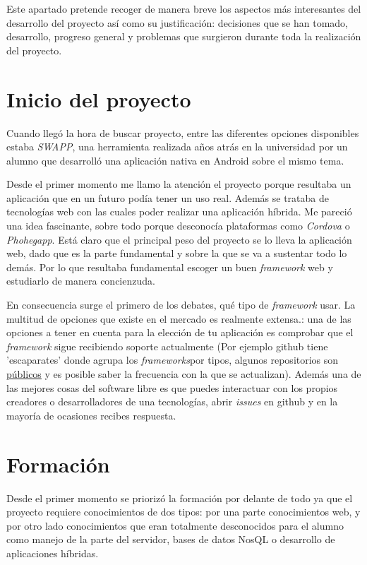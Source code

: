 
Este apartado pretende recoger de manera breve los aspectos más interesantes del desarrollo del proyecto así como su justificación: decisiones que se han tomado, desarrollo, progreso general y problemas que surgieron durante toda la realización del proyecto.


\section{Inicio del proyecto}\label{inicio-proyecto}
Cuando llegó la hora de buscar proyecto, entre las  diferentes opciones disponibles estaba \emph{SWAPP}, una herramienta realizada años atrás en la universidad por un alumno que desarrolló una aplicación nativa en Android sobre el mismo tema.

 Desde el primer momento me llamo la atención el proyecto porque resultaba un aplicación que en un futuro podía tener un uso real. Además se trataba de tecnologías web con las cuales poder realizar una aplicación híbrida. Me pareció una idea fascinante, sobre todo porque desconocía plataformas como \emph{Cordova} o \emph{Phohegapp}. Está claro que el principal peso del proyecto se lo lleva la aplicación web, dado que es la parte fundamental y sobre la que se va a sustentar todo lo demás. Por lo que resultaba fundamental escoger un buen \emph{framework} web y estudiarlo de manera concienzuda.
 
  En consecuencia surge el primero de los debates, qué tipo de \emph{framework} usar. La multitud de opciones que existe en el mercado es realmente extensa.: una de las opciones a tener en cuenta para la elección de tu aplicación es comprobar que el \emph{framework} sigue recibiendo soporte actualmente (Por ejemplo github tiene 'escaparates' donde agrupa los \emph{frameworks}por tipos, algunos repositorios son \href{ https://github.com/showcases/web-application-frameworks/}{públicos}  y es posible saber la frecuencia con la que se actualizan). Además una de las mejores cosas del software libre es que puedes interactuar con los propios creadores  o desarrolladores de una tecnologías, abrir \emph{issues} en github y en la mayoría de  ocasiones recibes respuesta. 
  

  \section{Formación}\label{formacion}
Desde el primer momento se priorizó la formación por delante de todo ya que el proyecto requiere conocimientos de dos tipos: por una parte conocimientos web, y por otro lado conocimientos que eran totalmente desconocidos para el alumno como manejo de la parte del servidor, bases de datos NosQL o desarrollo de aplicaciones híbridas. 


